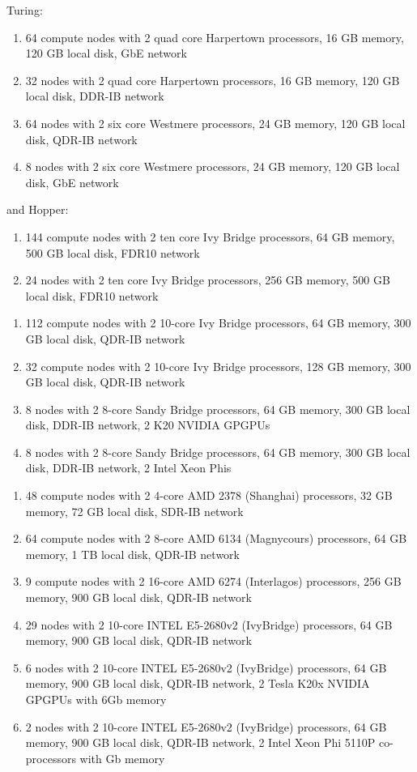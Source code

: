 \ifantwerpen
Turing:
  \begin{enumerate}
    \item  64 compute nodes with 2 quad core Harpertown processors, 16 GB
    memory, 120 GB local disk, GbE network
    \item  32 nodes with 2 quad core Harpertown processors, 16 GB memory,
           120 GB local disk, DDR-IB network
    \item  64 nodes with 2 six core Westmere processors, 24 GB memory,
           120 GB local disk, QDR-IB network
    \item  8 nodes with 2 six core Westmere processors, 24 GB memory,
           120 GB local disk, GbE network
  \end{enumerate}
and Hopper:
  \begin{enumerate}
    \item  144 compute nodes with 2 ten core Ivy Bridge processors, 64 GB
    memory, 500 GB local disk, FDR10 network
    \item  24 nodes with 2 ten core Ivy Bridge processors, 256 GB memory,
           500 GB local disk, FDR10 network
  \end{enumerate}
\fi
\ifleuven
  \begin{enumerate}
    \item  112 compute nodes with 2 10-core Ivy Bridge processors, 64 GB memory,
           300 GB local disk, QDR-IB network
    \item  32 compute nodes with 2 10-core Ivy Bridge processors, 128 GB memory,
           300 GB local disk, QDR-IB network
    \item  8 nodes with 2 8-core Sandy Bridge processors, 64 GB memory,
           300 GB local disk, DDR-IB network, 2 K20 NVIDIA GPGPUs
    \item  8 nodes with 2 8-core Sandy Bridge processors, 64 GB memory,
           300 GB local disk, DDR-IB network, 2 Intel Xeon Phis
  \end{enumerate}
\fi
\ifbrussel
  \begin{enumerate}
    \item  48 compute nodes with 2 4-core AMD 2378 (Shanghai) processors, 32 GB
    memory, 72 GB local disk, SDR-IB network
    \item  64 compute nodes with 2 8-core AMD 6134 (Magnycours) processors, 64
    GB memory, 1 TB local disk, QDR-IB network
    \item  9 compute nodes with 2 16-core AMD 6274 (Interlagos) processors, 256
    GB memory, 900 GB local disk, QDR-IB network
    \item  29 nodes with 2 10-core INTEL E5-2680v2 (IvyBridge) processors, 64
    GB memory, 900 GB local disk, QDR-IB network
    \item  6 nodes with 2 10-core INTEL E5-2680v2 (IvyBridge) processors, 64 GB
    memory, 900 GB local disk, QDR-IB network, 2 Tesla K20x NVIDIA GPGPUs with
    6Gb memory
    \item  2 nodes with 2 10-core INTEL E5-2680v2 (IvyBridge) processors, 64 GB
    memory, 900 GB local disk, QDR-IB network, 2 Intel Xeon Phi 5110P
    co-processors with Gb memory
  \end{enumerate}
